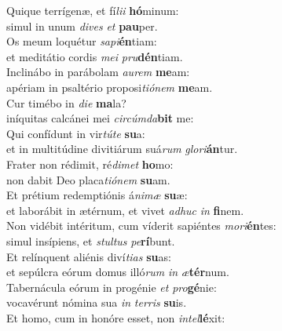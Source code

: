 \evenverse Quique terrígenæ, et fí\textit{li}\textit{i} \textbf{hó}minum:~\*\\
\evenverse simul in unum \textit{di}\textit{ves} \textit{et} \textbf{pau}per.\\
\oddverse Os meum loquétur \textit{sa}\textit{pi}\textbf{én}tiam:~\*\\
\oddverse et meditátio cordis \textit{me}\textit{i} \textit{pru}\textbf{dén}tiam.\\
\evenverse Inclinábo in parábolam \textit{au}\textit{rem} \textbf{me}am:~\*\\
\evenverse apériam in psaltério proposi\textit{ti}\textit{ó}\textit{nem} \textbf{me}am.\\
\oddverse Cur timébo in \textit{di}\textit{e} \textbf{ma}la?~\*\\
\oddverse iníquitas calcánei mei \textit{cir}\textit{cúm}\textit{da}\textbf{bit} me:\\
\evenverse Qui confídunt in vir\textit{tú}\textit{te} \textbf{su}a:~\*\\
\evenverse et in multitúdine divitiárum suá\textit{rum} \textit{glo}\textit{ri}\textbf{án}tur.\\
\oddverse Frater non rédimit, ré\textit{di}\textit{met} \textbf{ho}mo:~\*\\
\oddverse non dabit Deo placa\textit{ti}\textit{ó}\textit{nem} \textbf{su}am.\\
\evenverse Et prétium redemptiónis á\textit{ni}\textit{mæ} \textbf{su}æ:~\*\\
\evenverse et laborábit in ætérnum, et vivet \textit{a}\textit{dhuc} \textit{in} \textbf{fi}nem.\\
\oddverse Non vidébit intéritum, cum víderit sapiéntes \textit{mo}\textit{ri}\textbf{én}tes:~\*\\
\oddverse simul insípiens, et \textit{stul}\textit{tus} \textit{pe}\textbf{rí}bunt.\\
\evenverse Et relínquent aliénis diví\textit{ti}\textit{as} \textbf{su}as:~\*\\
\evenverse et sepúlcra eórum domus illó\textit{rum} \textit{in} \textit{æ}\textbf{tér}num.\\
\oddverse Tabernácula eórum in progénie \textit{et} \textit{pro}\textbf{gé}nie:~\*\\
\oddverse vocavérunt nómina sua \textit{in} \textit{ter}\textit{ris} \textbf{su}is.\\
\evenverse Et homo, cum in honóre esset, non \textit{in}\textit{tel}\textbf{lé}xit:~\*\\
